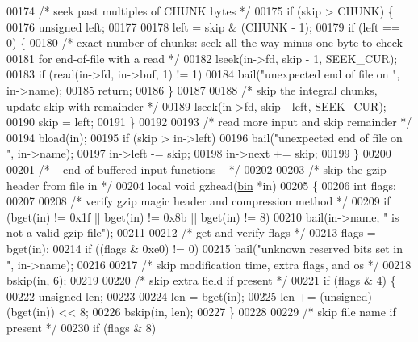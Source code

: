 \begin{DoxyCode}
{00174     \textcolor{comment}{/* seek past multiples of CHUNK bytes */}
00175     \textcolor{keywordflow}{if} (skip > CHUNK) \{
00176         \textcolor{keywordtype}{unsigned} left;
00177 
00178         left = skip & (CHUNK - 1);
00179         \textcolor{keywordflow}{if} (left == 0) \{
00180             \textcolor{comment}{/* exact number of chunks: seek all the way minus one byte to check}
00181 \textcolor{comment}{               for end-of-file with a read */}
00182             lseek(in->fd, skip - 1, SEEK\_CUR);
00183             \textcolor{keywordflow}{if} (read(in->fd, in->buf, 1) != 1)
00184                 bail(\textcolor{stringliteral}{"unexpected end of file on "}, in->name);
00185             \textcolor{keywordflow}{return};
00186         \}
00187 
00188         \textcolor{comment}{/* skip the integral chunks, update skip with remainder */}
00189         lseek(in->fd, skip - left, SEEK\_CUR);
00190         skip = left;
00191     \}
00192 
00193     \textcolor{comment}{/* read more input and skip remainder */}
00194     bload(in);
00195     \textcolor{keywordflow}{if} (skip > in->left)
00196         bail(\textcolor{stringliteral}{"unexpected end of file on "}, in->name);
00197     in->left -= skip;
00198     in->next += skip;
00199 \}
00200 
00201 \textcolor{comment}{/* -- end of buffered input functions -- */}
00202 
00203 \textcolor{comment}{/* skip the gzip header from file in */}
00204 local \textcolor{keywordtype}{void} gzhead(\hyperlink{structbin}{bin} *in)
00205 \{
00206     \textcolor{keywordtype}{int} flags;
00207 
00208     \textcolor{comment}{/* verify gzip magic header and compression method */}
00209     \textcolor{keywordflow}{if} (bget(in) != 0x1f || bget(in) != 0x8b || bget(in) != 8)
00210         bail(in->name, \textcolor{stringliteral}{" is not a valid gzip file"});
00211 
00212     \textcolor{comment}{/* get and verify flags */}
00213     flags = bget(in);
00214     \textcolor{keywordflow}{if} ((flags & 0xe0) != 0)
00215         bail(\textcolor{stringliteral}{"unknown reserved bits set in "}, in->name);
00216 
00217     \textcolor{comment}{/* skip modification time, extra flags, and os */}
00218     bskip(in, 6);
00219 
00220     \textcolor{comment}{/* skip extra field if present */}
00221     \textcolor{keywordflow}{if} (flags & 4) \{
00222         \textcolor{keywordtype}{unsigned} len;
00223 
00224         len = bget(in);
00225         len += (unsigned)(bget(in)) << 8;
00226         bskip(in, len);
00227     \}
00228 
00229     \textcolor{comment}{/* skip file name if present */}
00230     \textcolor{keywordflow}{if} (flags & 8)
}
\end{DoxyCode}
